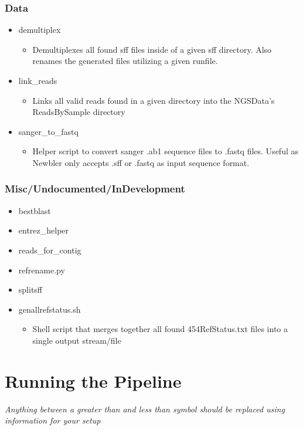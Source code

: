 \documentclass{article}
\begin{document}
\subsubsection{Data}
 \begin{itemize}
  \item demultiplex
   \begin{itemize}
    \item Demultiplexes all found sff files inside of a given sff directory. Also renames the generated files utilizing a given runfile.
   \end{itemize}
  \item link\_reads
   \begin{itemize}
    \item Links all valid reads found in a given directory into the NGSData's ReadsBySample directory
   \end{itemize}
  \item sanger\_to\_fastq
   \begin{itemize}
    \item Helper script to convert sanger .ab1 sequence files to .fastq files. Useful as Newbler only accepts .sff or .fastq as input sequence format.
   \end{itemize}
 \end{itemize}
\subsubsection{Misc/Undocumented/InDevelopment}
 \begin{itemize}
  \item bestblast
  \item entrez\_helper
  \item reads\_for\_contig
  \item refrename.py
  \item splitsff
  \item genallrefstatus.sh
   \begin{itemize}
    \item Shell script that merges together all found 454RefStatus.txt files into a single output stream/file
   \end{itemize}
 \end{itemize}

\section{Running the Pipeline}

\textit{Anything between a greater than and less than symbol should be replaced using information for your setup}
\end{document}
